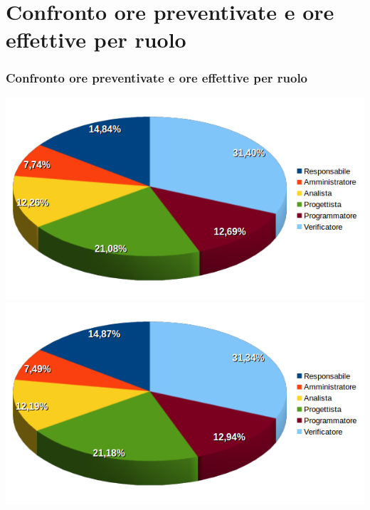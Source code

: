 \section{Confronto ore preventivate e ore effettive per ruolo}
\begin{frame}
	\frametitle{Confronto ore preventivate e ore effettive per ruolo}	
\begin{center}
	\includegraphics[scale=0.30]{img/orePREVENTIVATEperruolo.png}
	\qquad\qquad
	\includegraphics[scale=0.30]{img/oreEFFETTIVEperruolo.png}
\end{center}
	
	
\end{frame}

